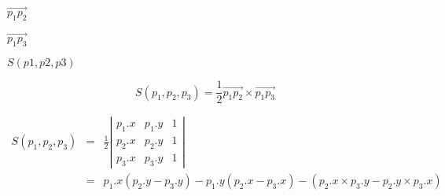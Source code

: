 \documentclass{article}
\begin{document}
$ \vec{p_1p_2} $
\pagebreak

$ \vec{p_1p_3} $
\pagebreak

$ S(p1, p2, p3) $
\pagebreak

\[ S(p_1, p_2, p_3) = \frac{1}{2} \vec{p_1p_2} \times \vec{p_1p_3}\]
\pagebreak

\begin{eqnarray*} S(p_1, p_2, p_3) & = & \frac{1}{2} \left| \begin{array}{ccc} p_1.x & p_1.y & 1 \\ p_2.x & p_2.y & 1 \\ p_3.x & p_3.y & 1 \end{array} \right| \\ & = & p_1.x(p_2.y - p_3.y) - p_1.y(p_2.x - p_3.x) - (p_2.x\times p_3.y - p_2.y\times p_3.x) \end{eqnarray*}
\pagebreak
\end{document}

